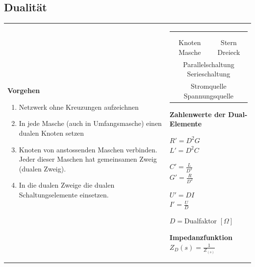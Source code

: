 			
\subsection{Dualität}
	\begin{tabular}{ll}
    \parbox{11.5cm}{    		
			\textbf{Vorgehen}
			\begin{enumerate}{\setlength{\itemsep}{0cm}\setlength{\parsep}{0cm} \setlength{\topsep}{0cm}}
	          \item Netzwerk ohne Kreuzungen aufzeichnen
	          \item In jede Masche (auch in Umfangsmasche) einen dualen Knoten
	          setzen
	          \item Knoten von anstossenden Maschen verbinden. Jeder dieser Maschen
	          hat gemeinsamen Zweig (dualen Zweig). 
	          \item  In die dualen Zweige die dualen Schaltungselemente einsetzen.
	        \end{enumerate}
    	}
    	& \parbox{6.5cm}{
    		\begin{tabular}{c c}
            $C \leftrightarrow L$ 
            	&$R \leftrightarrow G$ \\
            $u \leftrightarrow i$
            	& $\underline{Z} \leftrightarrow \underline{Y}$ \\
            Knoten $\leftrightarrow$ Masche
            	& Stern $\leftrightarrow$ Dreieck \\
            \multicolumn{2}{c}{Parallelschaltung $\leftrightarrow$
            	Serieschaltung} \\
            \multicolumn{2}{c}{Stromquelle $\leftrightarrow$ Spannungsquelle}            
	        \end{tabular}
			\vspace{.1cm} 

			\textbf{Zahlenwerte der Dual-Elemente}\\
			\begin{minipage}{2cm}
	        	$R'=D^2G$ \\
	        	$L'=D^2C$
	        \end{minipage}
			\begin{minipage}{2cm}
	        	$C'=\frac{L}{D^2}$ \\
	        	$G'=\frac{R}{D^2}$
	        \end{minipage}
			\begin{minipage}{2cm}
	        	$U'=DI$ \\
	        	$I'=\frac{U}{D}$
	        \end{minipage}
			\begin{minipage}{4cm}
	        	$D =$Dualfaktor $[\Omega]$
	        \end{minipage}
			\vspace{.1cm} 

    		\textbf{Impedanzfunktion}
    		$Z_D(s) = \frac{1}{Z_(s)}$ \\
    	}
    \end{tabular}

